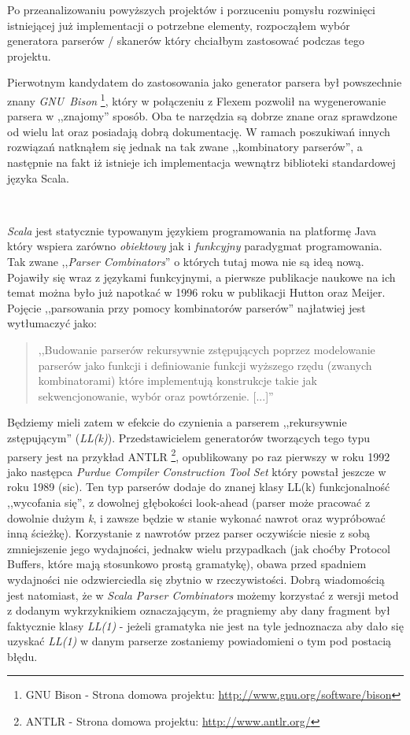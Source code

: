 \documentclass[pdflatex,11pt]{aghdpl}
\begin{document}
Po przeanalizowaniu powyższych projektów i porzuceniu pomysłu rozwinięci istniejącej już implementacji o potrzebne elementy, rozpocząłem
wybór generatora parserów / skanerów który chciałbym zastosować podczas tego projektu. 

Pierwotnym kandydatem do zastosowania jako generator parsera był powszechnie znany \textit{GNU~Bison} \footnote{GNU Bison - Strona domowa projektu: \href{http://www.gnu.org/software/bison}{http://www.gnu.org/software/bison}},
który w połączeniu z Flexem pozwolił na wygenerowanie parsera w ,,znajomy'' sposób. Oba te narzędzia są dobrze znane oraz sprawdzone od wielu lat oraz posiadają dobrą dokumentację.
W ramach poszukiwań innych rozwiązań natknąłem się jednak na tak zwane ,,kombinatory parserów'', a następnie na fakt iż istnieje ich implementacja wewnątrz
biblioteki standardowej języka Scala.

~\\\*

\textit{Scala} jest statycznie typowanym językiem programowania na platformę Java który wspiera zarówno \textit{obiektowy} jak i \textit{funkcyjny} paradygmat programowania.
Tak zwane ,,\textit{Parser Combinators}'' o których tutaj mowa nie są ideą nową. Pojawiły się wraz z językami funkcyjnymi, a pierwsze publikacje naukowe
na ich temat można było już napotkać w 1996 roku \cite{monadparsing} w publikacji Hutton oraz Meijer.
Pojęcie ,,parsowania przy pomocy kombinatorów parserów'' najłatwiej jest wytłumaczyć jako:


\begin{quotation}
 ,,Budowanie parserów rekursywnie zstępujących poprzez modelowanie parserów jako funkcji
   i definiowanie funkcji wyższego rzędu (zwanych kombinatorami) które implementują 
   konstrukcje takie jak sekwencjonowanie, wybór oraz powtórzenie. [...]''
   \cite{monadparsing}
\end{quotation}

Będziemy mieli zatem w efekcie do czynienia a parserem ,,rekursywnie zstępującym'' (\textit{LL(k)}). Przedstawicielem generatorów tworzących tego typu parsery jest na przykład
ANTLR \footnote{ANTLR - Strona domowa projektu: \href{http://www.antlr.org/}{http://www.antlr.org/}}, opublikowany po raz pierwszy w roku 1992 jako następca \textit{Purdue Compiler Construction Tool Set} który powstał jeszcze w roku 1989 (sic).
Ten typ parserów dodaje do znanej klasy LL(k) funkcjonalność ,,wycofania się'', z dowolnej głębokości look-ahead (parser może pracować z dowolnie dużym \textit{k},
i zawsze będzie w stanie wykonać nawrot oraz wypróbować inną ścieżkę). Korzystanie z nawrotów przez parser oczywiście niesie z sobą zmniejszenie jego wydajności,
jednakw wielu przypadkach (jak choćby Protocol Buffers, które mają stosunkowo prostą gramatykę), obawa przed spadniem wydajności nie odzwierciedla się zbytnio w 
rzeczywistości. Dobrą wiadomością jest natomiast, że w \textit{Scala Parser Combinators} możemy korzystać z wersji metod z dodanym wykrzyknikiem oznaczającym,
że pragniemy aby dany fragment był faktycznie klasy \textit{LL(1)} - jeżeli gramatyka nie jest na tyle jednoznacza aby dało się uzyskać \textit{LL(1)} w danym parserze
zostaniemy powiadomieni o tym pod postacią błędu.
\end{document}
